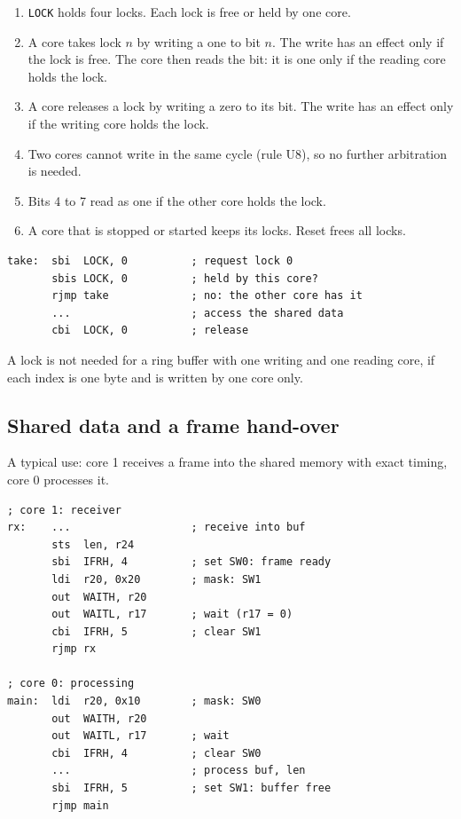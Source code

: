 \documentclass[10pt,a4paper]{article}
\newcommand{\reg}[1]{\texttt{#1}}
\begin{document}
\begin{enumerate}[label=\textbf{C\arabic*},leftmargin=2.6em,start=5]
\item \reg{LOCK} holds four locks. Each lock is free or held by one core.
\item A core takes lock $n$ by writing a one to bit $n$. The write has an effect only if the lock is free. The
core then reads the bit: it is one only if the reading core holds the lock.
\item A core releases a lock by writing a zero to its bit. The write has an effect only if the writing core holds
the lock.
\item Two cores cannot write in the same cycle (rule U8), so no further arbitration is needed.
\item Bits 4 to 7 read as one if the other core holds the lock.
\item A core that is stopped or started keeps its locks. Reset frees all locks.
\end{enumerate}

\begin{verbatim}
take:  sbi  LOCK, 0          ; request lock 0
       sbis LOCK, 0          ; held by this core?
       rjmp take             ; no: the other core has it
       ...                   ; access the shared data
       cbi  LOCK, 0          ; release
\end{verbatim}

A lock is not needed for a ring buffer with one writing and one reading core, if each index is one byte and is
written by one core only.

\subsection{Shared data and a frame hand-over}

A typical use: core 1 receives a frame into the shared memory with exact timing, core 0 processes it.

\begin{verbatim}
; core 1: receiver
rx:    ...                   ; receive into buf
       sts  len, r24
       sbi  IFRH, 4          ; set SW0: frame ready
       ldi  r20, 0x20        ; mask: SW1
       out  WAITH, r20
       out  WAITL, r17       ; wait (r17 = 0)
       cbi  IFRH, 5          ; clear SW1
       rjmp rx

; core 0: processing
main:  ldi  r20, 0x10        ; mask: SW0
       out  WAITH, r20
       out  WAITL, r17       ; wait
       cbi  IFRH, 4          ; clear SW0
       ...                   ; process buf, len
       sbi  IFRH, 5          ; set SW1: buffer free
       rjmp main
\end{verbatim}
\end{document}
